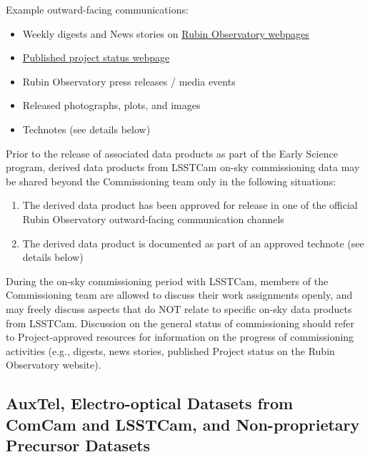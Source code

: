 \documentclass[SE,authoryear,toc,lsstdraft]{lsstdoc}
\begin{document}
Example outward-facing communications:

\begin{itemize}

  \item Weekly digests and News stories on \href{https://rubinobservatory.org/}{Rubin Observatory webpages}

  \item \href{https://www.lsst.org/about/project-status}{Published project status webpage}

  \item Rubin Observatory press releases / media events

  \item Released photographs, plots, and images

  \item Technotes (see details below)

\end{itemize}

Prior to the release of associated data products as part of the Early Science program, derived data products from LSSTCam on-sky commissioning data may be shared beyond the Commissioning team only in the following situations:

\begin{enumerate}

  \item The derived data product has been approved for release in one of the official Rubin Observatory outward-facing communication channels

  \item The derived data product is documented as part of an approved technote (see details below)

\end{enumerate}

During the on-sky commissioning period with LSSTCam, members of the Commissioning team are allowed to discuss their work assignments openly, and may freely discuss aspects that do NOT relate to specific on-sky data products from LSSTCam.
Discussion on the general status of commissioning should refer to Project-approved resources for information on the progress of commissioning activities (e.g., digests, news stories, published Project status on the Rubin Observatory website).

\subsection{AuxTel, Electro-optical Datasets from ComCam and LSSTCam, and Non-proprietary Precursor Datasets}
\end{document}
